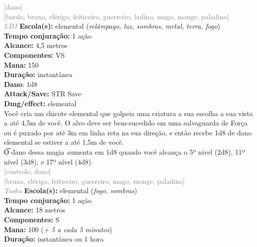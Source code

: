 \documentclass{RPG_Adventure}[2021/10/20]
\begin{document}
{\scriptsize \textcolor{gray}{[dano]\\}}
{\scriptsize \textcolor{gray}{[bardo, bruxo, clérigo, feiticeiro, guerreiro, ladino, mago, monge, paladino]\\}}
{\tiny \textcolor{gray}{\textit{LDJ}}}
{\small \t \textbf{Escola(s):} elemental (\textit{relâmpago, luz, sombras, metal, terra, fogo})\\\t \textbf{Tempo conjuração:} 1 ação\\\t \textbf{Alcance:} 4,5 metros\\\t \textbf{Componentes:} VS\\\t \textbf{Mana:} 150\\\t \textbf{Duração:} instantânea\\\t \textbf{Dano}: 1d8\\\t \textbf{Attack/Save:} STR Save\\\t \textbf{Dmg/effect:} elemental\\}
{\normalsize Você cria um chicote elemental que golpeia uma criatura a sua escolha a sua vista a até 4,5m de você. O alvo deve ser bem-sucedido em uma salvaguarda de Força ou é puxado por até 3m em linha reta na sua direção, e então recebe 1d8 de dano elemental se estiver a até 1,5m de você.\\\t O dano dessa magia aumenta em 1d8 quando você alcança o 5º nível (2d8), 11º nível (3d8), e 17º nível (4d8).\\}
{\scriptsize \textcolor{gray}{[controle, dano]\\}}
{\scriptsize \textcolor{gray}{[bruxo, clérigo, feiticeiro, guerreiro, mago, monge, paladino]\\}}
{\tiny \textcolor{gray}{\textit{Tasha}}}
{\small \t \textbf{Escola(s):} elemental (\textit{fogo, sombras})\\\t \textbf{Tempo conjuração:} 1 ação\\\t \textbf{Alcance:} 18 metros\\\t \textbf{Componentes:} S\\\t \textbf{Mana:} 100 (\textit{+ 5 a cada 5 minutos})\\\t \textbf{Duração:} instantânea ou 1 hora\\}
\end{document}

